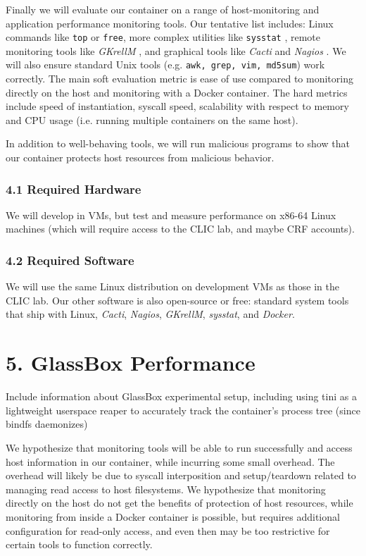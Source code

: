 \documentclass{proc}
\begin{document}
Finally we will evaluate our container on a range of host-monitoring and application performance monitoring tools. Our tentative list includes: Linux commands like \texttt{top} or \texttt{free}, more complex utilities like \texttt{sysstat} \cite{sysstat}, remote monitoring tools like \textit{GKrellM} \cite{gkrellm}, and graphical tools like \textit{Cacti} \cite{cacti} and \textit{Nagios} \cite{nagios}. We will also ensure standard Unix tools (e.g. \texttt{awk, grep, vim, md5sum}) work correctly. The main soft evaluation metric is ease of use compared to monitoring directly on the host and monitoring with a Docker container. The hard metrics include speed of instantiation, syscall speed, scalability with respect to memory and CPU usage (i.e. running multiple containers on the same host).

In addition to well-behaving tools, we will run malicious programs to show that our container protects host resources from malicious behavior.

\subsubsection*{4.1 Required Hardware}

We will develop in VMs, but test and measure performance on x86-64 Linux machines (which will require access to the CLIC lab, and maybe CRF accounts).

\subsubsection*{4.2 Required Software}

We will use the same Linux distribution on development VMs as those in the CLIC lab. Our other software is also open-source or free: standard system tools that ship with Linux, \textit{Cacti}, \textit{Nagios}, \textit{GKrellM}, \textit{sysstat}, and \textit{Docker}.

\section*{5. GlassBox Performance}

Include information about GlassBox experimental setup, including using tini as a lightweight userspace reaper to accurately track the container's process tree (since bindfs daemonizes)

We hypothesize that monitoring tools will be able to run successfully and access host information in our container, while incurring some small overhead. The overhead will likely be due to syscall interposition and setup/teardown related to managing read access to host filesystems. We hypothesize that monitoring directly on the host do not get the benefits of protection of host resources, while monitoring from inside a Docker container is possible, but requires additional configuration for read-only access, and even then may be too restrictive for certain tools to function correctly.
\end{document}
